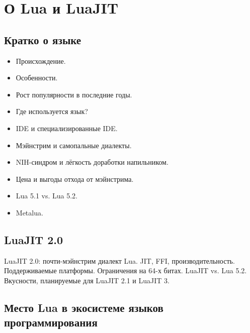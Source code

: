 \documentclass[aspectratio=169,handout]{beamer}
\begin{document}
\section{О Lua и LuaJIT}


\subsection*{Кратко о языке}

\begin{frame}
  \begin{itemize}
    \item Происхождение.
    \item Особенности.
    \item Рост популярности в последние годы.
    \item Где используется язык?
    \item IDE и специализированные IDE.
    \item Мэйнстрим и самопальные диалекты.
    \item NIH-синдром и лёгкость доработки напильником.
    \item Цена и выгоды отхода от мэйнстрима.
    \item Lua 5.1 vs. Lua 5.2.
    \item Metalua.
  \end{itemize}
\end{frame}


\subsection*{LuaJIT 2.0}

\begin{frame}
  LuaJIT 2.0: почти-мэйнстрим диалект Lua. JIT, FFI, производительность. Поддерживаемые платформы. Ограничения на 64-х битах. LuaJIT vs. Lua 5.2. Вкусности, планируемые для LuaJIT 2.1 и LuaJIT 3.
\end{frame}


\subsection*{Место Lua в экосистеме языков программирования}
\end{document}
